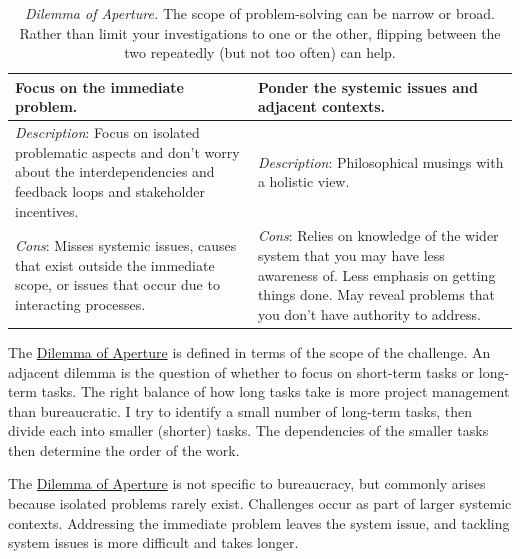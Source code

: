 \begin{center}
\begin{table}[H] %
\begin{tabular}{ | m{\dilemmatablewidth}| m{\dilemmatablewidth} | } 
  \hline
  \textbf{Focus on the immediate problem.} &
  \textbf{Ponder the systemic issues and adjacent contexts.} \\
  \hline
  \textit{Description}: Focus on isolated problematic aspects and don't worry about the interdependencies and feedback loops and stakeholder incentives. &
  \textit{Description}: Philosophical musings with a holistic view. \\
  \hline
  \textit{Cons}: Misses systemic issues, causes that exist outside the immediate scope, or issues that occur due to interacting processes. & 
  \textit{Cons}: Relies on knowledge of the wider system that you may have less awareness of. Less emphasis on getting things done. May reveal problems that you don't have authority to address. \\
  \hline
\end{tabular}
\caption{
\textit{Dilemma of Aperture.}
The scope of problem-solving can be narrow or broad. Rather than limit your investigations to one or the other, flipping between the two repeatedly (but not too often) can help.
}
\label{table:dilemma-personal-focus-vs-systemic}
\end{table}
\end{center}

The \hyperref[table:dilemma-personal-focus-vs-systemic]{Dilemma of Aperture} 
\iftoggle{printedonpaper}{ (\ref{table:dilemma-personal-focus-vs-systemic})}{} is 
defined in terms of the scope of the challenge. An adjacent dilemma is the question of whether to focus on short-term tasks or long-term tasks. The right balance of how long tasks take is more project management than bureaucratic. I try to identify a small number of long-term tasks, then divide each into smaller (shorter) tasks. The dependencies of the smaller tasks then determine the order of the work.

The \hyperref[table:dilemma-personal-focus-vs-systemic]{Dilemma of Aperture} is not specific to bureaucracy, but commonly arises because isolated problems rarely exist. Challenges occur as part of larger systemic contexts. Addressing the immediate problem leaves the system issue, and tackling system issues is more difficult and takes longer. 

